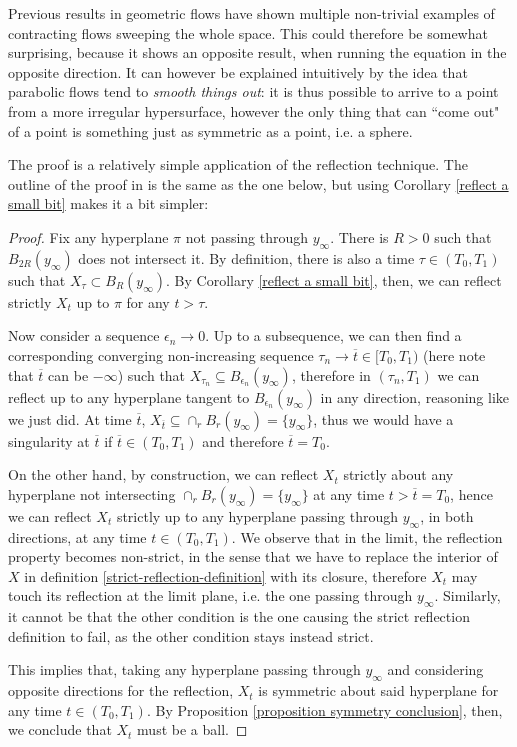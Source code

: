 Previous results in geometric flows have shown multiple non-trivial examples of contracting flows sweeping the whole space.
This could therefore be somewhat surprising, because it shows an opposite result, when running the equation in the opposite direction. It can however be explained intuitively by the idea that parabolic flows tend to \textit{smooth things out}: it is thus possible to arrive to a point from a more irregular hypersurface, however the only thing that can ``come out" of a point is something just as symmetric as a point, i.e. a sphere. 

The proof is a relatively simple application of the reflection technique. The outline of the proof in \cite{SinestRisa} is the same as the one below, but using Corollary \ref{reflect a small bit} makes it a bit simpler: 

\begin{proof}
	Fix any hyperplane $\pi$ not passing through $y_\infty$. There is $R>0$ such that $B_{2R}(y_\infty)$ does not intersect it. By definition, there is also a time  $\tau \in  (T_0, T_1)$ such that $X_\tau \subset B_R(y_\infty)$. 
	By Corollary \ref{reflect a small bit}, then, we can reflect strictly $X_t$ up to $\pi$ for any $t>\tau$. 
	
	Now consider a sequence  $\epsilon_n\rightarrow 0$. Up to a subsequence, we can then find a corresponding converging non-increasing sequence $\tau_n\rightarrow \overline{t}\in [T_0, T_1)$ (here note that $\overline{t}$ can be $-\infty$) such that $X_{\tau_n}\subseteq B_{\epsilon_n}(y_\infty)$, therefore in $(\tau_n, T_1)$ we can reflect up to any hyperplane tangent to  $B_{\epsilon_n}(y_\infty)$ in any direction, reasoning like we just did. At time $\overline{t}$, $X_{\overline{t}} \subseteq \cap_r B_{r}(y_\infty) = \{y_\infty\}$, thus we would have a singularity at $\overline{t}$ if  $\overline{t}\in(T_0, T_1)$ and therefore $\overline{t}=T_0$. 
	
	On the other hand, by construction, we can reflect $X_{t}$ strictly about any hyperplane not intersecting $\cap_r B_{r}(y_\infty) = \{y_\infty\}$ at any time $t>\overline{t}=T_0$, hence we can reflect $X_{t}$ strictly up to any hyperplane passing through $y_\infty$, in both directions, at any  time $t\in (T_0, T_1)$. We observe that in the limit, the reflection property becomes non-strict, in the sense that we have to replace the interior of $X$ in definition \ref{strict-reflection-definition} with its closure, therefore $X_{t}$ may touch its reflection at the limit plane, i.e. the one passing through $y_\infty$. Similarly, it cannot be that the other condition is the one causing the strict reflection definition to fail, as the other condition stays instead strict. 
	
	This implies that, taking any hyperplane passing through $y_\infty$ and considering opposite directions for the reflection, $X_{t}$ is symmetric about said hyperplane for any time $t\in (T_0, T_1)$. By Proposition \ref{proposition symmetry conclusion}, then, we conclude that $X_{t}$ must be a ball.	
\end{proof}


